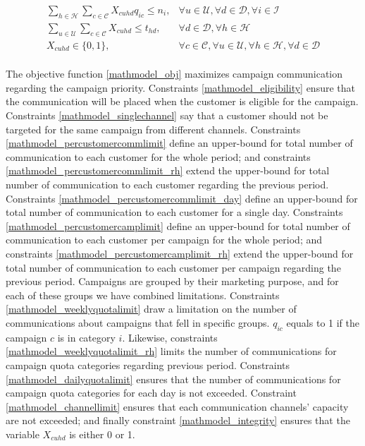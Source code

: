 \documentclass[11pt]{article}
\begin{document}
\begin{align}
&\sum\limits_{h\in\mathcal{H}}\sum\limits_{c\in\mathcal{C}}X_{{c}{u}{h}{d}}  q_{{i}{c}} \leq n_{i}, &\forall u \in \mathcal{U}, \forall d \in \mathcal{D}, \forall i \in \mathcal{I} \label{mathmodel_dailyquotalimit}&\\
&\sum\limits_{u\in\mathcal{U}}\sum\limits_{c\in\mathcal{C}}X_{{c}{u}{h}{d}} \leq t_{{h}{d}}, &\forall d \in \mathcal{D}, \forall h \in \mathcal{H} \label{mathmodel_channellimit}&\\
&X_{{c}{u}{h}{d}} \in \{0,1\},&\forall c \in \mathcal{C}, \forall u \in \mathcal{U}, \forall h \in \mathcal{H}, \forall d \in \mathcal{D} \label{mathmodel_integrity}
\end{align}\\

The objective function \eqref{mathmodel_obj} maximizes campaign communication regarding the campaign priority. Constraints \eqref{mathmodel_eligibility} ensure that the communication will be placed when the customer is eligible for the campaign. Constraints \eqref{mathmodel_singlechannel} say that a customer should not be targeted for the same campaign from different channels. Constraints \eqref{mathmodel_percustomercommlimit} define an upper-bound for total number of communication to each customer for the whole period; and constraints \eqref{mathmodel_percustomercommlimit_rh} extend the upper-bound for total number of communication to each customer regarding the previous period. Constraints \eqref{mathmodel_percustomercommlimit_day} define an upper-bound for total number of communication to each customer for a single day. Constraints \eqref{mathmodel_percustomercamplimit} define an upper-bound for total number of communication to each customer per campaign for the whole period; and constraints \eqref{mathmodel_percustomercamplimit_rh} extend the upper-bound for total number of communication to each customer per campaign regarding the previous period. Campaigns are grouped by their marketing purpose, and for each of these groups we have combined limitations. Constraints \eqref{mathmodel_weeklyquotalimit} draw a limitation on the number of communications about campaigns that fell in specific groups. $q_{{i}{c}}$ equals to 1 if the campaign $c$ is in category  $i$. Likewise, constraints \eqref{mathmodel_weeklyquotalimit_rh} limits the number of communications for campaign quota categories regarding previous period. Constraints \eqref{mathmodel_dailyquotalimit} ensures that the number of communications for campaign quota categories for each day is not exceeded. Constraint \eqref{mathmodel_channellimit} ensures that each communication channels' capacity are not exceeded; and finally constraint \eqref{mathmodel_integrity} ensures that the variable $X_{{c}{u}{h}{d}}$ is either 0 or 1.\\
\end{document}
